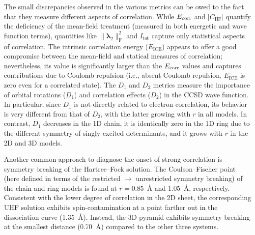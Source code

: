 \documentclass[aip,jcp,amsmath,amssymb, preprint]{revtex4-1}
\newcommand*{\Ecorr}{$E_{\rm{corr}}$\xspace}
\newcommand*{\RCMnorm}{$\norm{\pmb{\lambda}_{2}}^{2}_\mathrm{F}$\xspace}
\providecommand{\norm}[1]{\lVert#1\rVert}
\begin{document}
The small discrepancies observed in the various metrics can be owed to the fact that they measure different aspects of correlation. 
While \Ecorr and  $|C_\mathrm{HF}|$ quantify the deficiency of the mean-field treatment (measured in both energetic and wave function terms), quantities like \RCMnorm and $I_\mathrm{tot}$ capture only statistical aspects of correlation.
The intrinsic correlation energy ($E_\mathrm{ICE}$) appears to offer a good compromise between the mean-field and statical measures of correlation; nevertheless, its value is significantly larger than the \Ecorr values and captures contributions due to Coulomb repulsion (i.e., absent Coulomb repulsion, $E_\mathrm{ICE}$ is zero even for a correlated state).
The $D_1$ and $D_2$ metrics measure the importance of orbital rotations ($D_1$) and correlation effects ($D_2$) in the CCSD wave function.
In particular, since $D_1$ is not directly related to electron correlation, its behavior is very different from that of $D_2$, with the latter growing with $r$ in all models.
In contrast, $D_1$ decreases in the 1D chain, it is identically zero in the 1D ring due to the different symmetry of singly excited determinants, and it grows with $r$ in the 2D and 3D models.

Another common approach to diagnose the onset of strong correlation is symmetry breaking of the Hartree--Fock solution.
The Coulson--Fischer point (here defined in terms of the restricted $\rightarrow$ unrestricted symmetry breaking) of the chain and ring models is found at $r=0.85$~{\AA} and 1.05~{\AA}, respectively.
Consistent with the lower degree of correlation in the 2D sheet, the corresponding UHF solution exhibits spin-contamination at a point farther out in the dissociation curve (1.35~{\AA}).
Instead,  the 3D pyramid exhibits symmetry breaking at the smallest distance (0.70~{\AA}) compared  to the other three systems.
\end{document}
